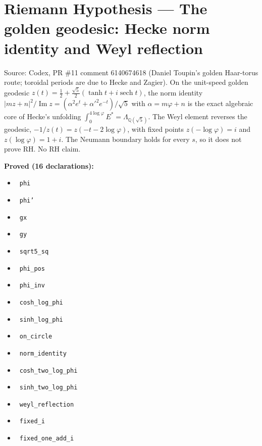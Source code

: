 \documentclass{report}
\theoremstyle{definition}
\begin{document}
\section{Riemann Hypothesis --- The golden geodesic: Hecke norm identity and Weyl reflection}
Source: Codex, PR \#11 comment 6140674618 (Daniel Toupin's golden Haar-torus route; toroidal periods are due to Hecke and Zagier). On the unit-speed golden geodesic $z(t)=\tfrac12+\tfrac{\sqrt5}{2}(\tanh t+i\operatorname{sech}t)$, the norm identity $|mz+n|^2/\operatorname{Im}z=(\alpha^2e^t+\alpha'^2e^{-t})/\sqrt5$ with $\alpha=m\varphi+n$ is the exact algebraic core of Hecke's unfolding $\int_0^{4\log\varphi}E^*=\Lambda_{\mathbb{Q}(\sqrt5)}$. The Weyl element reverses the geodesic, $-1/z(t)=z(-t-2\log\varphi)$, with fixed points $z(-\log\varphi)=i$ and $z(\log\varphi)=1+i$. The Neumann boundary holds for every $s$, so it does not prove RH. No RH claim.

\noindent\textbf{Proved (16 declarations):}
\begin{itemize}
  \item {}\leanok\ \texttt{phi}
  \item {}\leanok\ \texttt{phi'}
  \item {}\leanok\ \texttt{gx}
  \item {}\leanok\ \texttt{gy}
  \item {}\leanok\ \texttt{sqrt5\_sq}
  \item {}\leanok\ \texttt{phi\_pos}
  \item {}\leanok\ \texttt{phi\_inv}
  \item {}\leanok\ \texttt{cosh\_log\_phi}
  \item {}\leanok\ \texttt{sinh\_log\_phi}
  \item {}\leanok\ \texttt{on\_circle}
  \item {}\leanok\ \texttt{norm\_identity}
  \item {}\leanok\ \texttt{cosh\_two\_log\_phi}
  \item {}\leanok\ \texttt{sinh\_two\_log\_phi}
  \item {}\leanok\ \texttt{weyl\_reflection}
  \item {}\leanok\ \texttt{fixed\_i}
  \item {}\leanok\ \texttt{fixed\_one\_add\_i}
\end{itemize}
\end{document}
